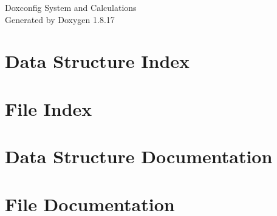 \let\mypdfximage\pdfximage\def\pdfximage{\immediate\mypdfximage}\documentclass[twoside]{book}
\newcommand{\+}{\discretionary{\mbox{\scriptsize$\hookleftarrow$}}{}{}}
\newcommand{\clearemptydoublepage}{%
  \newpage{\pagestyle{empty}\cleardoublepage}%
}
\begin{document}
\hypersetup{pageanchor=false,
             bookmarksnumbered=true,
             pdfencoding=unicode
            }
\begin{titlepage}
\vspace*{7cm}
\begin{center}%
{\Large Doxconfig System and Calculations }\\
\vspace*{1cm}
{\large Generated by Doxygen 1.8.17}\\
\end{center}
\end{titlepage}
\clearemptydoublepage
{}
\tableofcontents
\clearemptydoublepage
{}
\hypersetup{pageanchor=true}

\chapter{Data Structure Index}

\chapter{File Index}

\chapter{Data Structure Documentation}

\chapter{File Documentation}



\backmatter
\newpage
{}
\clearemptydoublepage
{}
\printindex
\end{document}
